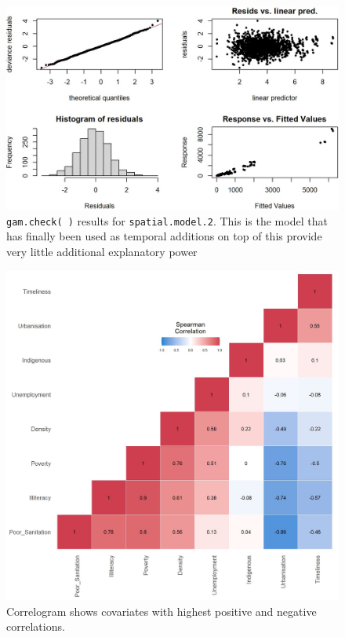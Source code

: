 \begin{figure}[H]
\centering
\includegraphics[scale=0.5]{spatial_model_2_check.jpg}
\caption{\label{fig:spatial_model_2_check}\texttt{gam.check( )} results for \texttt{spatial.model.2}. This is the model that has finally been used as temporal additions on top of this provide very little additional explanatory power}
\end{figure}



\begin{figure}[H]
\centering
\includegraphics[scale=0.4]{spearman_correl.jpg}
\caption{\label{fig:spearman_correl}Correlogram shows covariates with highest positive and negative correlations.}
\end{figure}

